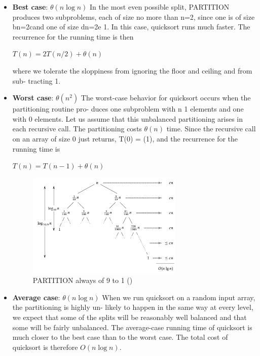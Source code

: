 \begin{itemize}
    \item \textbf{Best case}: $\theta(n\log n)$ \newline In the most even possible split, PARTITION produces two subproblems, each of
    size no more than n=2, since one is of size bn=2cand one of size dn=2e 1. In this
    case, quicksort runs much faster. The recurrence for the running time is then
    \begin{center}
        $T(n) = 2T(n/2) + \theta(n)$
    \end{center}
    where we tolerate the sloppiness from ignoring the floor and ceiling and from sub-
    tracting 1.
    \item \textbf{Worst case}: $\theta(n^2)$ \newline
    The worst-case behavior for quicksort occurs when the partitioning routine pro-
    duces one subproblem with n 1 elements and one with 0 elements. Let us assume that this unbalanced partitioning arises
    in each recursive call. The partitioning costs $\theta (n)$ time. Since the recursive call
    on an array of size 0 just returns, T(0) = \theta(1), and the recurrence for the running
    time is
    \begin{center}
        $T(n) = T(n-1) + \theta(n)$
    \end{center}
    \begin{figure}[H]
        \centering
        \includegraphics[width=0.7\textwidth]{assets/quicksort_avg_case.png}
        \caption{PARTITION always of 9 to 1 (\cite{cormen2022introduction})}
    \end{figure}
    \item \textbf{Average case}: $\theta(n\log n)$ \newline 
    When we run quicksort on a random input array, the partitioning is highly un-
    likely to happen in the same way at every level, we expect that some of the splits will be reasonably well balanced and
    that some will be fairly unbalanced. The average-case running time of quicksort is much closer to the best case than to the worst case.
    The total cost of quicksort is therefore $O(n\log n)$.
\end{itemize}

